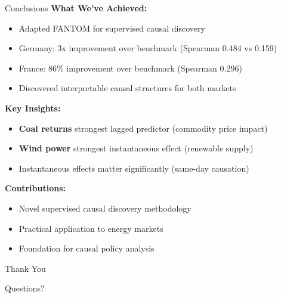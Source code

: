 \documentclass[aspectratio=169]{beamer}
\begin{document}
\begin{frame}{Conclusions}
\textbf{What We've Achieved:}
\begin{itemize}
    \item \textcolor{reprogreen}{Adapted FANTOM for supervised causal discovery}
    \item \textcolor{reprogreen}{Germany: 3x improvement over benchmark (Spearman 0.484 vs 0.159)}
    \item \textcolor{reprogreen}{France: 86\% improvement over benchmark (Spearman 0.296)}
    \item \textcolor{reprogreen}{Discovered interpretable causal structures for both markets}
\end{itemize}

\vspace{0.3cm}
\textbf{Key Insights:}
\begin{itemize}
    \item \textbf{Coal returns} strongest lagged predictor (commodity price impact)
    \item \textbf{Wind power} strongest instantaneous effect (renewable supply)
    \item Instantaneous effects matter significantly (same-day causation)
\end{itemize}

\vspace{0.3cm}
\textbf{Contributions:}
\begin{itemize}
    \item Novel supervised causal discovery methodology
    \item Practical application to energy markets
    \item Foundation for causal policy analysis
\end{itemize}
\end{frame}

\begin{frame}
\centering
\Huge Thank You

\vspace{1cm}
\Large Questions?


\end{frame}
\end{document}
